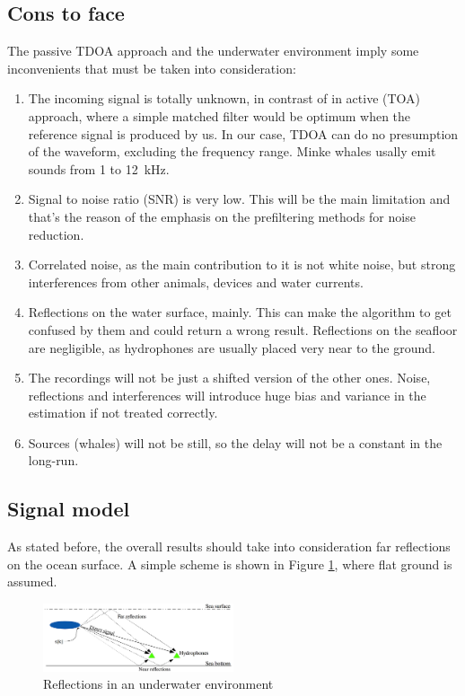 \subsection{Cons to face}
The passive TDOA approach and the underwater environment imply some inconvenients that must be taken into consideration:
\begin{enumerate}
  \item The incoming signal is totally unknown, in contrast of in active (TOA) approach, where a simple matched filter would be optimum when the reference signal is produced by us. In our case, TDOA can do no presumption of the waveform, excluding the frequency range. Minke whales usally emit sounds from 1 to \SI{12}{\kilo\Hz}.
  \item Signal to noise ratio (SNR) is very low. This will be the main limitation and that's the reason of the emphasis on the prefiltering methods for noise reduction.
  \item Correlated noise, as the main contribution to it is not white noise, but strong interferences from other animals, devices and water currents.
  \item Reflections on the water surface, mainly. This can make the algorithm to get confused by them and could return a wrong result. Reflections on the seafloor are negligible, as hydrophones are usually placed very near to the ground.
  \item The recordings will not be just a shifted version of the other ones. Noise, reflections and interferences will introduce huge bias and variance in the estimation if not treated correctly.
  \item Sources (whales) will not be still, so the delay will not be a constant in the long-run.
\end{enumerate}

\vspace{5pt}
\subsection{Signal model}
  As stated before, the overall results should take into consideration far reflections on the ocean surface. A simple scheme is shown in Figure \ref{fig:reflections}, where flat ground is assumed.  

  \vspace{5pt}
  \begin{figure}[htb]
	  \begin{center}
		  \includegraphics[width=0.5\textwidth]{figures/model.png}
	  \end{center}
	  \caption{Reflections in an underwater environment}
	  \label{fig:reflections}
  \end{figure}
  
